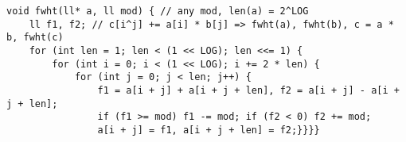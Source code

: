\documentclass[12pt]{article}
\begin{document}


\begin{verbatim}
void fwht(ll* a, ll mod) { // any mod, len(a) = 2^LOG
    ll f1, f2; // c[i^j] += a[i] * b[j] => fwht(a), fwht(b), c = a * b, fwht(c)
    for (int len = 1; len < (1 << LOG); len <<= 1) {
        for (int i = 0; i < (1 << LOG); i += 2 * len) {
            for (int j = 0; j < len; j++) {
                f1 = a[i + j] + a[i + j + len], f2 = a[i + j] - a[i + j + len];
                if (f1 >= mod) f1 -= mod; if (f2 < 0) f2 += mod;
                a[i + j] = f1, a[i + j + len] = f2;}}}}
\end{verbatim}

\end{document}
